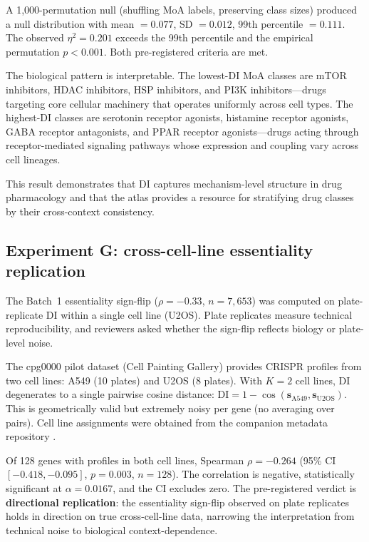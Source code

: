 \documentclass[11pt]{article}
\begin{document}
A 1{,}000-permutation null (shuffling MoA labels, preserving class
sizes) produced a null distribution with mean $= 0.077$,
SD $= 0.012$, 99th percentile $= 0.111$.  The observed
$\eta^2 = 0.201$ exceeds the 99th percentile and the empirical
permutation $p < 0.001$.  Both pre-registered criteria are met.

The biological pattern is interpretable.  The lowest-DI MoA classes are
mTOR inhibitors, HDAC inhibitors, HSP inhibitors, and PI3K
inhibitors---drugs targeting core cellular machinery
\citep{santos2017drug} that operates uniformly across cell types.  The highest-DI classes are serotonin
receptor agonists, histamine receptor agonists, GABA receptor
antagonists, and PPAR receptor agonists---drugs acting through
receptor-mediated signaling pathways whose expression and coupling vary
across cell lineages.

This result demonstrates that DI captures mechanism-level structure in
drug pharmacology and that the atlas provides a resource for stratifying
drug classes by their cross-context consistency.

\subsection{Experiment G: cross-cell-line essentiality replication}

The Batch~1 essentiality sign-flip ($\rho = -0.33$, $n = 7{,}653$) was
computed on plate-replicate DI within a single cell line (U2OS).  Plate
replicates measure technical reproducibility, and reviewers asked whether
the sign-flip reflects biology or plate-level noise.

The cpg0000 pilot dataset (Cell Painting Gallery) provides CRISPR
profiles from two cell lines: A549 (10 plates) and U2OS (8 plates).
With $K = 2$ cell lines, DI degenerates to a single pairwise cosine
distance: $\mathrm{DI} = 1 - \cos(\mathbf{s}_{\mathrm{A549}},
\mathbf{s}_{\mathrm{U2OS}})$.  This is geometrically valid but
extremely noisy per gene (no averaging over pairs).  Cell line
assignments were obtained from the companion metadata repository
\citep{chandrasekaran2024cpjump1}.

Of 128 genes with profiles in both cell lines, Spearman
$\rho = -0.264$ (95\% CI $[-0.418, -0.095]$, $p = 0.003$,
$n = 128$).  The correlation is negative, statistically significant
at $\alpha = 0.0167$, and the CI excludes zero.  The pre-registered
verdict is \textbf{directional replication}: the essentiality sign-flip
observed on plate replicates holds in direction on true
cross-cell-line data, narrowing the interpretation from technical noise
to biological context-dependence.
\end{document}
